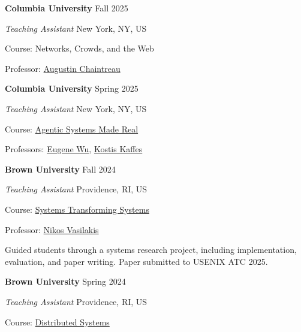 \documentclass[margin,11pt]{resume}
\newcommand{\descriptionVSpace}{\vspace{0.5ex}\xspace}
\newcommand{\subsectionVSpace}{\vspace{4.5ex}\xspace}
\newcommand{\sectionVSpace}{\vspace{1ex}\xspace} %
\newcommand{\teachingVSpace}{\vspace{3ex}\xspace} %
\newcommand{\header}[1]{\textbf{#1}\xspace}
\newcommand{\institution}[1]{\header{#1}\xspace}
\newcommand{\place}[1]{#1\xspace}
\newcommand{\teachingRole}[1]{\textit{#1}\xspace}
\newcommand{\singleDate}[1]{#1\xspace}
\newcommand{\stitle}[1]{#1:\xspace}
\newlength{\cvsectionbodyoffset}
\newlength{\cvsectionwidestheaderwidth}
\newcommand{\recordCvSectionHeaderWidth}{%
	\ifdim\wd\cvsectionheaderbox>\cvsectionwidestheaderwidth
		\global\cvsectionwidestheaderwidth=\wd\cvsectionheaderbox
	\fi
}
\newcommand{\entryNeedspace}{\par\Needspace{2\baselineskip}}
\newenvironment{jobDuties}{\descriptionVSpace}{\par}
\newenvironment{rSection}[1]{%
	\par
	\setCvSectionHeader{#1}%
	\recordCvSectionHeaderWidth%
	\begin{list}{}{%
		\setlength{\leftmargin}{\cvsectionbodyoffset}%
		\setlength{\rightmargin}{0pt}%
		\setlength{\labelwidth}{\cvsectionbodyoffset}%
		\setlength{\labelsep}{0pt}%
		\setlength{\itemindent}{0pt}%
		\setlength{\listparindent}{0pt}%
		\setlength{\topsep}{0pt}%
		\setlength{\partopsep}{0pt}%
		\setlength{\parsep}{0pt}%
		\setlength{\itemsep}{0pt}%
		\renewcommand{\makelabel}[1]{\makebox[\labelwidth][l]{\raisebox{0pt}[0pt][0pt]{##1}}}%
	}%
	\item[\usebox{\cvsectionheaderbox}]%
}{\end{list}\sectionVSpace\par}
\newenvironment{teachingItem}{\entryNeedspace}{\par\teachingVSpace} %
\begin{document}
\begin{resume}
	\begin{rSection}{Teaching}
		\begin{teachingItem}
			\institution{Columbia University} \hfill \singleDate{Fall 2025}

			\teachingRole{Teaching Assistant} \hfill \place{New York, NY, US}

			\stitle{Course} Networks, Crowds, and the Web

			\stitle{Professor} \href{https://www.engineering.columbia.edu/faculty-staff/directory/augustin-chaintreau}{Augustin Chaintreau}
		\end{teachingItem}

		\begin{teachingItem}
			\institution{Columbia University} \hfill \singleDate{Spring 2025}

			\teachingRole{Teaching Assistant} \hfill \place{New York, NY, US}

			\stitle{Course} \href{https://w6113.github.io/}{Agentic Systems Made Real}

			\stitle{Professors} \href{https://www.cs.columbia.edu/~ewu/}{Eugene Wu}, \href{https://www.cs.columbia.edu/~kkaffes/index.html}{Kostis Kaffes}
		\end{teachingItem}

		\begin{teachingItem}
			\institution{Brown University} \hfill \singleDate{Fall 2024}

			\teachingRole{Teaching Assistant} \hfill \place{Providence, RI, US}

			\stitle{Course} \href{https://cs.brown.edu/courses/csci2952r/}{Systems Transforming Systems}

			\stitle{Professor} \href{https://nikos.vasilak.is}{Nikos Vasilakis}

			\begin{jobDuties}
				Guided students through a systems research project, including implementation, evaluation, and paper writing.
				Paper submitted to USENIX ATC 2025.
			\end{jobDuties}
		\end{teachingItem}

		\begin{teachingItem}
			\institution{Brown University} \hfill \singleDate{Spring 2024}

			\teachingRole{Teaching Assistant} \hfill \place{Providence, RI, US}

			\stitle{Course} \href{https://cs.brown.edu/courses/csci1380/s24/}{Distributed Systems}


\end{teachingItem}
\end{rSection}
\end{resume}
\end{document}
